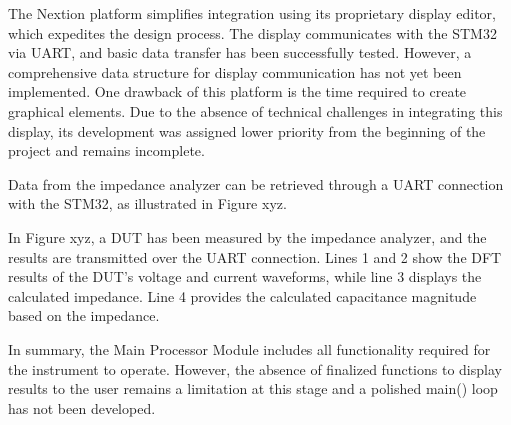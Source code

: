 The Nextion platform simplifies integration using its proprietary display editor, which expedites the design process. The display communicates with the STM32 via UART, and basic data transfer has been successfully tested. However, a comprehensive data structure for display communication has not yet been implemented. One drawback of this platform is the time required to create graphical elements. Due to the absence of technical challenges in integrating this display, its development was assigned lower priority from the beginning of the project and remains incomplete.

Data from the impedance analyzer can be retrieved through a UART connection with the STM32, as illustrated in Figure xyz.


In Figure xyz, a DUT has been measured by the impedance analyzer, and the results are transmitted over the UART connection. Lines 1 and 2 show the DFT results of the DUT's voltage and current waveforms, while line 3 displays the calculated impedance. Line 4 provides the calculated capacitance magnitude based on the impedance.

In summary, the Main Processor Module includes all functionality required for the instrument to operate. However, the absence of finalized functions to display results to the user remains a limitation at this stage and a polished main() loop has not been developed.
